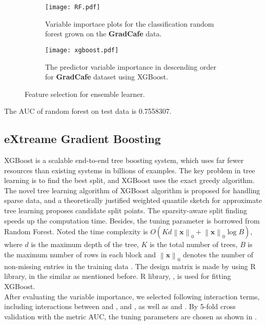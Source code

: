 \begin{figure}[tbp]
    \centering
    \begin{subfigure}{.5\linewidth}
	\centering
	\texttt{[image: RF.pdf]}
	\caption{Variable importace plots for the classification random forest grown on the \textbf{GradCafe} data.}
	\label{fig:rf}
    \end{subfigure}%
    \begin{subfigure}{.5\linewidth}
    \centering
    \texttt{[image: xgboost.pdf]}
    \caption{The predictor variable importance in descending order for \textbf{GradCafe} dataset using XGBoost.}
    \label{fig: xgb}
\end{subfigure}
    \caption{Feature selection for  ensemble learner.}
\end{figure}
The AUC of random forest on test data is 0.7558307. 

\subsection{eXtreame Gradient Boosting} \label{sub: xgb}
XGBoost is a scalable end-to-end tree boosting system, which uses far fewer resources than existing systems in billions of examples. The key problem in tree learning is to find the best split, and XGBoost uses the exact greedy algorithm. The novel tree learning algorithm of XGBoost algorithm is proposed for handling sparse data, and a theoretically justified weighted quantile sketch for approximate tree learning proposes candidate split points. The sparsity-aware split finding speeds up the computation time. Besides, the tuning parameter  is borrowed from Random Forest.
Noted the time complexity is $O(Kd\left\|\mathbf{x}\right\|_0+\left\|\mathbf{x}\right\|_0\log B)$, where $d$ is the maximum depth of the tree, $K$ is the total number of trees, $B$ is the maximum number of rows in each block and $\left\|\mathbf{x}\right\|_0$ denotes the number of non-missing entries in the training data \cite{chen:2016:xgboost}.
The design matrix is made by using R library,  in the similar as mentioned before. R library, , is used for fitting XGBoost. \\
After evaluating the variable importance, we selected following interaction terms, including interactions between  and ,  and , as well as  and . 
By 5-fold cross validation with the metric AUC, the tuning parameters are chosen as shown in .

